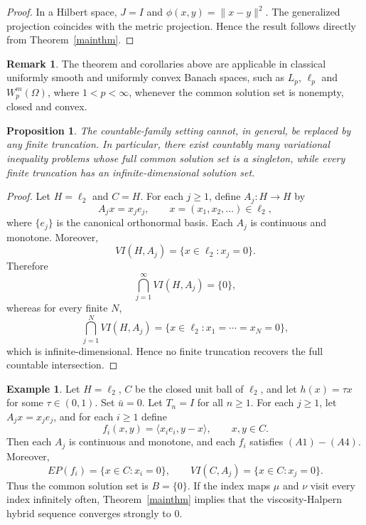 \documentclass[leqno,12pt]{amsart}
\newtheorem{proposition}[theorem]{Proposition}
\theoremstyle{definition}
\newtheorem{example}{Example}
\newtheorem{remark}{Remark}
\numberwithin{equation}{section}
\begin{document}
\begin{proof}
In a Hilbert space, $J=I$ and $\phi(x,y)=\|x-y\|^2$. The generalized projection coincides with the metric projection. Hence the result follows directly from Theorem~\ref{mainthm}.
\end{proof}

\begin{remark}
The theorem and corollaries above are applicable in classical uniformly smooth and uniformly convex Banach spaces, such as $L_p$, $\ell_p$ and $W_p^m(\Omega)$, where $1<p<\infty$, whenever the common solution set is nonempty, closed and convex.
\end{remark}

\begin{proposition}\label{finite-truncation-prop}
The countable-family setting cannot, in general, be replaced by any finite truncation. In particular, there exist countably many variational inequality problems whose full common solution set is a singleton, while every finite truncation has an infinite-dimensional solution set.
\end{proposition}

\begin{proof}
Let $H=\ell_2$ and $C=H$. For each $j\geq 1$, define $A_j:H\to H$ by
\[
A_jx=x_j e_j,
\qquad x=(x_1,x_2,\ldots)\in \ell_2,
\]
where $\{e_j\}$ is the canonical orthonormal basis. Each $A_j$ is continuous and monotone. Moreover,
\[
VI(H,A_j)=\{x\in \ell_2:x_j=0\}.
\]
Therefore
\[
\bigcap_{j=1}^{\infty}VI(H,A_j)=\{0\},
\]
whereas for every finite $N$,
\[
\bigcap_{j=1}^{N}VI(H,A_j)=\{x\in \ell_2:x_1=\cdots=x_N=0\},
\]
which is infinite-dimensional. Hence no finite truncation recovers the full countable intersection.
\end{proof}

\begin{example}\label{l2example}
Let $H=\ell_2$, $C$ be the closed unit ball of $\ell_2$, and let $h(x)=\tau x$ for some $\tau\in(0,1)$. Set $\bar u=0$. Let $T_n=I$ for all $n\geq 1$. For each $j\geq 1$, let $A_jx=x_j e_j$, and for each $i\geq 1$ define
\[
f_i(x,y)=\langle x_i e_i,y-x\rangle,
\qquad x,y\in C.
\]
Then each $A_j$ is continuous and monotone, and each $f_i$ satisfies $(A1)-(A4)$. Moreover,
\[
EP(f_i)=\{x\in C:x_i=0\},
\qquad
VI(C,A_j)=\{x\in C:x_j=0\}.
\]
Thus the common solution set is $B=\{0\}$. If the index maps $\mu$ and $\nu$ visit every index infinitely often, Theorem~\ref{mainthm} implies that the viscosity-Halpern hybrid sequence converges strongly to $0$.
\end{example}
\end{document}
